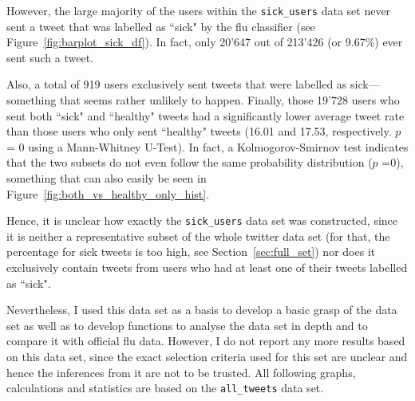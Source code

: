 \documentclass[11pt, a4paper,twoside]{report}\usepackage[]{graphicx}\usepackage[]{color}
\begin{document}
However, the large majority of the users within the \texttt{sick\_users} data set never sent a tweet that was labelled as ``sick" by the flu classifier (see Figure~\ref{fig:barplot_sick_df}). In fact, only 20'647 out of 213'426 (or 9.67\%) ever sent such a tweet.

Also, a total of 919 users exclusively sent tweets that were labelled as sick---something that seems rather unlikely to happen. Finally, those 19'728 users who sent both ``sick" and ``healthy" tweets had a significantly lower average tweet rate than those users who only sent ``healthy" tweets (16.01 and 17.53, respectively. $p$ = 0 using a Mann-Whitney U-Test). In fact, a Kolmogorov-Smirnov test indicates that the two subsets do not even follow the same probability distribution ($p$ =0), something that can also easily be seen in Figure~\ref{fig:both_vs_healthy_only_hist}.

Hence, it is unclear how exactly the \texttt{sick\_users} data set was constructed, since it is neither a representative subset of the whole twitter data set (for that, the percentage for sick tweets is too high, see Section~\ref{sec:full_set}) nor does it exclusively contain tweets from users who had at least one of their tweets labelled as ``sick".

Nevertheless, I used this data set as a basis to develop a basic grasp of the data set as well as to develop functions to analyse the data set in depth and to compare it with official flu data. However, I do not report any more results based on this data set, since the exact selection criteria used for this set are unclear and hence the inferences from it are not to be trusted. All following graphs, calculations and statistics are based on the \texttt{all\_tweets} data set.\newpage
\end{document}
